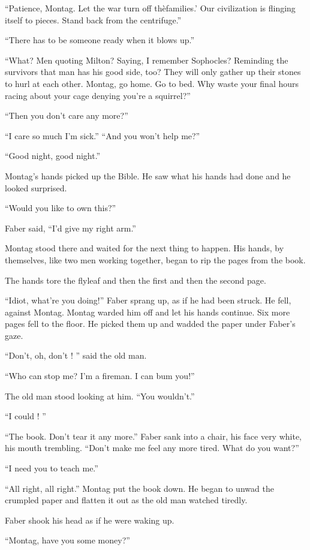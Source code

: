 \documentclass[11pt,openany]{book}
\begin{document}
``Patience, Montag. Let the war turn off thèfamilies.' Our civilization is flinging itself to pieces. Stand back from the centrifuge.''

``There has to be someone ready when it blows up.''

``What? Men quoting Milton? Saying, I remember Sophocles? Reminding the survivors that man has his good side, too? They will only gather up their stones to hurl at each other. Montag, go home. Go to bed. Why waste your final hours racing about your cage denying you're a squirrel?''

``Then you don't care any more?''

``I care so much I'm sick.'' ``And you won't help me?''

``Good night, good night.''

Montag's hands picked up the Bible. He saw what his hands had done and he looked surprised.

``Would you like to own this?''

Faber said, ``I'd give my right arm.''

Montag stood there and waited for the next thing to happen. His hands, by themselves, like two men working together, began to rip the pages from the book.

The hands tore the flyleaf and then the first and then the second page.

``Idiot, what're you doing!'' Faber sprang up, as if he had been struck. He fell, against Montag. Montag warded him off and let his hands continue. Six more pages fell to the floor. He picked them up and wadded the paper under Faber's gaze.

``Don't, oh, don't ! '' said the old man.

``Who can stop me? I'm a fireman. I can bum you!''

The old man stood looking at him. ``You wouldn't.''

``I could ! ''

``The book. Don't tear it any more.'' Faber sank into a chair, his face very white, his mouth trembling. ``Don't make me feel any more tired. What do you want?''

``I need you to teach me.''

``All right, all right.'' Montag put the book down. He began to unwad the crumpled paper and flatten it out as the old man watched tiredly.

Faber shook his head as if he were waking up.

``Montag, have you some money?''
\end{document}
